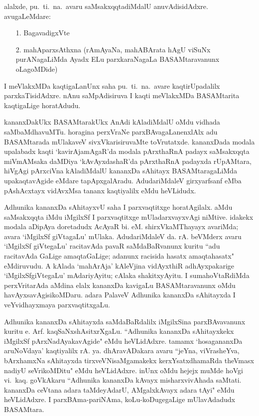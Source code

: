 \newpage

alalxde, pu.~ti.~na.~avaru saMsakxqqtadiMdalU anuvAdisidAdxre. avugaLeMdare:
\begin{itemize}
\itemsep=0pt
\item[1.] BagavadigxVte
\item[2.] mahAparxsAthxna (rAmAyaNa, mahABArata hAgU viSuNx purANagaLiMda Ayadx ELu parxkaraNagaLa BASAMtaravanunx oLagoMDide)
\end{itemize}

I meVlakxMDa kaqtigaLanUnx saha pu.~ti.~na.~avare kaqtirUpadalilx parxkaTisidAdxre. nAnu saMpAdisiruva I kaqti meVlakxMDa BASAMtarita kaqtigaLige horatAdudu.

kananxDakUkx BASAMtarakUkx AnAdi kAladiMdalU oMdu vidhada saMbaMdhavuMTu. horagina perxVraNe parxBAvagaLanenxlAlx adu BASAMtarada mUlakaveV sivxVkarisiruvaMte toVrutatxde. kananxDada modala upalabadx kaqti `kavirAjamAgaR'da modala pArxthaRnA padayx saMsakxqqta miVmAMsaka daMDiya `kAvAyxdashaR'da pArxthaRnA padayxda rUpAMtara, hiVgAgi pArxciVna kAladiMdalU kananxDa sAhitayx BASAMtaragaLiMda upakaqtavAgide eMdare tapApxgalAradu. AdudariMdaleV  girxyarfsanf eMba pAshAcxtayx vidAvxMsa tananx  kaqtiyalilx  eMdu heVLidudx.

Adhunika kananxDa sAhitayxvU saha I parxvaqtitxge horatAgilalx. aMdu saMsakxqqta iMdu iMgilxSf I parxvaqtitxge mUladarxvayxvAgi niMtive. idakekx modala aDipAya doretadudx AcAyaR bi. eM. shirxVkaMThayayx avariMda; avara `iMgilxSf giVtagaLu' mUlaka. AdudariMdaleV da. rA. beVMderx avaru `iMgilxSf giVtegaLu' racitavAda pavaR saMdaBaRvanunx kuritu ``adu racitavAda  GaLige amaqtaGaLige; adanunx racisida hasatx amaqtahasatx" eMdiruvudu. A kAlada `mahArAja' kAleVjina vidAyxthiR adhAyxpakarige `iMgilxSfgiVtegaLu' mAdariyAyitu; cAlaka shakitxyAyitu. I sumahoVtaRdiMda perxVritarAda aMdina elalx kananxDa kavigaLu BASAMtaravanunx oMdu havAyxsavAgisikoMDaru. adara PalaveV Adhunika kananxDa sAhitayxda I veYvidhayxmaya parxvaqtitxgaLu.

Adhunika kananxDa sAhitayxda saMdaBaRdalilx iMgilxSina parxBAvavanunx kuritu e. Arf. kaqSaNxshAsitxrXgaLu. ``Adhunika kananxDa sAhitayxkekx iMgilxSf pArxNadAyakavAgide" eMdu heVLidAdxre. tamamx `hosagananxDa aruNoVdaya' kaqtiyalilx rA. ya. dhAravADakara avaru ``jeYna, viVrasheYva, bArxhamxNa sAhitayxda tirxveVNisaMgamakekx kerxYsatxdhamaRda theVmasx nadiyU seVrikoMDitu" eMdu heVLidAdxre. inUnx oMdu hejejx muMde hoVgi \hbox{vi. kaq.} goVkAkaru ``Adhunika kananxDa kAvayx misharxvivAhada saMtati. kananxDa ceVtana adara taMdeyAdarU, AMgalxkAvayx adara tAyi" eMdu heVLidAdxre. I parxBAma-pariNAma, koLu-koDugegaLige mUlavAdadudx BASAMtara.  

